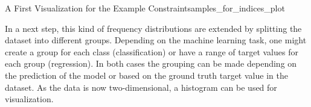 \begin{Bsp}{A First Visualization for the Example Constraint}{samples_for_indices_plot}
\begin{minipage}[t]{\linewidth}
\begin{minipage}[t]{0.4\linewidth}
            \label{fig:samples_for_indices_plot_3valued}
        \end{minipage}
    \end{minipage}
\end{Bsp}

In a next step, this kind of frequency distributions are extended by splitting the dataset into different groups. Depending on the machine learning task, one might create a group for each class (classification) or have a range of target values for each group (regression). In both cases the grouping can be made depending on the prediction of the model or based on the ground truth target value in the dataset. As the data is now two-dimensional, a histogram can be used for visualization.

